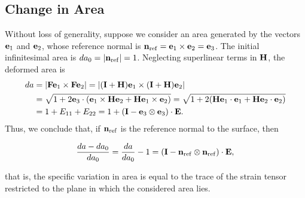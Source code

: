 \subsection{Change in Area}
Without loss of generality, suppose we consider an area generated by the vectors $\mathbf{e}_1$ and $\mathbf{e}_2$, whose reference normal is $\mathbf{n}_{\rm ref}=\mathbf{e}_1\times\mathbf{e}_2=\mathbf{e}_3$. The initial infinitesimal area is $da_0=|\mathbf{n}_{\rm ref}|=1$. Neglecting superlinear terms in $\mathbf{H}$, the deformed area is
\begin{equation}
	\begin{aligned}
		da&=|\mathbf{F}\mathbf{e}_1\times\mathbf{F}\mathbf{e}_2|=|(\mathbf{I}+\mathbf{H})\mathbf{e}_1\times(\mathbf{I}+\mathbf{H})\mathbf{e}_2|\\
		&=\sqrt{1+2\mathbf{e}_3\cdot(\mathbf{e}_1\times\mathbf{H}\mathbf{e}_2+\mathbf{H}\mathbf{e}_1\times\mathbf{e}_2)}=\sqrt{1+2(\mathbf{H}\mathbf{e}_1\cdot\mathbf{e}_1+\mathbf{H}\mathbf{e}_2\cdot\mathbf{e}_2)}\\
		&=1+E_{11}+E_{22}=1+(\mathbf{I}-\mathbf{e}_3\otimes\mathbf{e}_3)\cdot\mathbf{E}.
	\end{aligned}
\end{equation}
Thus, we conclude that, if $\mathbf{n}_{\rm ref}$ is the reference normal to the surface, then
\begin{definition}
	\begin{equation}\label{da}
		\frac{da-da_0}{da_0}=\frac{da}{da_0}-1=(\mathbf{I}-\mathbf{n}_{\rm ref}\otimes\mathbf{n}_{\rm ref})\cdot\mathbf{E},
	\end{equation}
\end{definition}
that is, the specific variation in area is equal to the trace of the strain tensor restricted to the plane in which the considered area lies.

